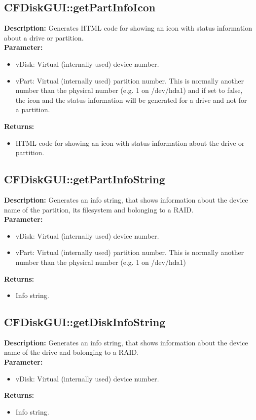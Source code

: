 \subsection{CFDiskGUI::getPartInfoIcon}
\textbf{Description:} Generates HTML code for showing an icon with status information about a drive or partition.\\
\textbf{Parameter:}
\begin{itemize}
\item vDisk: Virtual (internally used) device number.
\item vPart: Virtual (internally used) partition number. This is normally another number than the physical number (e.g. 1 on /dev/hda1) and if set to false, the icon and the status information will be generated for a drive and not for a partition.
\end{itemize}
\textbf{Returns:}
\begin{itemize}
\item HTML code for showing an icon with status information about the drive or partition.
\end{itemize}

\subsection{CFDiskGUI::getPartInfoString}
\textbf{Description:} Generates an info string, that shows information about the device name of the partition, its filesystem and bolonging to a RAID.\\
\textbf{Parameter:}
\begin{itemize}
\item vDisk: Virtual (internally used) device number.
\item vPart: Virtual (internally used) partition number. This is normally another number than the physical number (e.g. 1 on /dev/hda1)
\end{itemize}
\textbf{Returns:}
\begin{itemize}
\item Info string.
\end{itemize}

\subsection{CFDiskGUI::getDiskInfoString}
\textbf{Description:} Generates an info string, that shows information about the device name of the drive and bolonging to a RAID.\\
\textbf{Parameter:}
\begin{itemize}
\item vDisk: Virtual (internally used) device number.
\end{itemize}
\textbf{Returns:}
\begin{itemize}
\item Info string.
\end{itemize}

